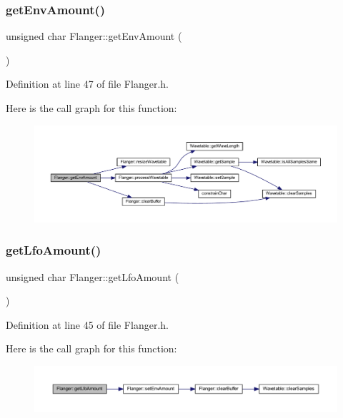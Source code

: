 \subsubsection{\texorpdfstring{get\+Env\+Amount()}{getEnvAmount()}}
{\footnotesize\ttfamily unsigned char Flanger\+::get\+Env\+Amount (\begin{DoxyParamCaption}{ }\end{DoxyParamCaption})\hspace{0.3cm}{\ttfamily [inline]}}



Definition at line 47 of file Flanger.\+h.

Here is the call graph for this function\+:
\nopagebreak
\begin{figure}[H]
\begin{center}
\leavevmode
\includegraphics[width=350pt]{class_flanger_ae86b7a0721c3a9893f3b9ec5f4b6c0fb_cgraph}
\end{center}
\end{figure}
\mbox{\label{class_flanger_a6d6289cd3c9ef3cc997e83441a89194f}} 
\subsubsection{\texorpdfstring{get\+Lfo\+Amount()}{getLfoAmount()}}
{\footnotesize\ttfamily unsigned char Flanger\+::get\+Lfo\+Amount (\begin{DoxyParamCaption}{ }\end{DoxyParamCaption})\hspace{0.3cm}{\ttfamily [inline]}}



Definition at line 45 of file Flanger.\+h.

Here is the call graph for this function\+:
\nopagebreak
\begin{figure}[H]
\begin{center}
\leavevmode
\includegraphics[width=350pt]{class_flanger_a6d6289cd3c9ef3cc997e83441a89194f_cgraph}
\end{center}
\end{figure}
\mbox{\label{class_flanger_af0c970c914193ea326ca177869f508c1}} 

